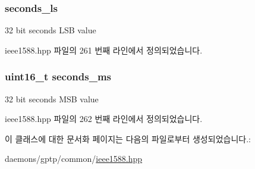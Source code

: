 \subsubsection[{\texorpdfstring{seconds\+\_\+ls}{seconds_ls}}]{ seconds\+\_\+ls}\hypertarget{class_timestamp_a2bf200e58cd268d8b86cf93c51500a44}{}\label{class_timestamp_a2bf200e58cd268d8b86cf93c51500a44}


32 bit seconds L\+SB value 



ieee1588.\+hpp 파일의 261 번째 라인에서 정의되었습니다.

\subsubsection[{\texorpdfstring{seconds\+\_\+ms}{seconds_ms}}]{\setlength{\rightskip}{0pt plus 5cm}uint16\+\_\+t seconds\+\_\+ms}\hypertarget{class_timestamp_a5d98378d782519e6f9c17db70f1620f0}{}\label{class_timestamp_a5d98378d782519e6f9c17db70f1620f0}


32 bit seconds M\+SB value 



ieee1588.\+hpp 파일의 262 번째 라인에서 정의되었습니다.



이 클래스에 대한 문서화 페이지는 다음의 파일로부터 생성되었습니다.\+:\begin{DoxyCompactItemize}
\item 
daemons/gptp/common/\hyperlink{ieee1588_8hpp}{ieee1588.\+hpp}\end{DoxyCompactItemize}
